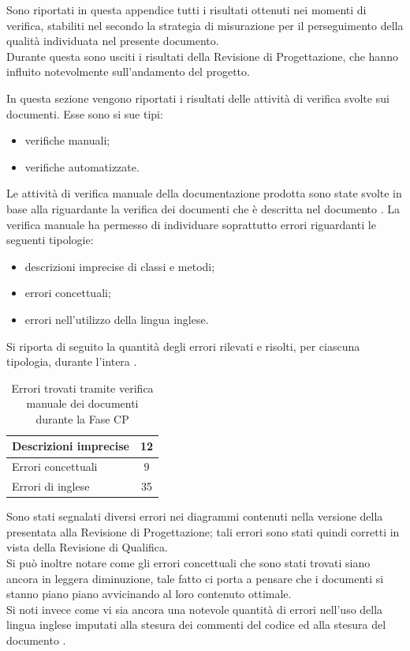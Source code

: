 
Sono riportati in questa appendice tutti i risultati ottenuti nei momenti di verifica, stabiliti nel  secondo la strategia di misurazione per il perseguimento della qualità individuata nel presente documento.\\
Durante questa  sono usciti i risultati della Revisione di Progettazione, che hanno influito notevolmente sull'andamento del progetto.

In questa sezione vengono riportati i risultati delle attività di verifica svolte sui documenti. Esse sono si sue tipi:
\begin{itemize}
\item verifiche manuali;
\item verifiche automatizzate.
\end{itemize}
Le attività di verifica manuale della documentazione prodotta sono state svolte in base alla  riguardante la verifica dei documenti che è descritta nel documento .
La verifica manuale ha permesso di individuare soprattutto errori riguardanti le seguenti tipologie:
\begin{itemize}
\item descrizioni imprecise di classi e metodi;
\item errori concettuali;
\item errori nell'utilizzo della lingua inglese.
\end{itemize}
Si riporta di seguito la quantità degli errori rilevati e risolti, per ciascuna tipologia, durante l'intera .
\begin{table}[H]
	\centering
		\begin{tabu}{| l | c |}
			\hline
				Descrizioni imprecise	&	12\\ \hline
				Errori concettuali	&	9\\ \hline
				Errori di inglese  &  35\\ \hline
		\end{tabu}
		\caption{Errori trovati tramite verifica manuale dei documenti durante la Fase CP}
\end{table}

Sono stati segnalati diversi errori nei diagrammi  contenuti nella versione della  presentata alla Revisione di Progettazione; tali errori sono stati quindi corretti in vista della Revisione di Qualifica.\\
Si può inoltre notare come gli errori concettuali che sono stati trovati siano ancora in leggera diminuzione, tale fatto ci porta a pensare che i documenti si stanno piano piano avvicinando al loro contenuto ottimale.\\
Si noti invece come vi sia ancora una notevole quantità di errori nell'uso della lingua inglese imputati alla stesura dei commenti del codice ed alla stesura del documento .

